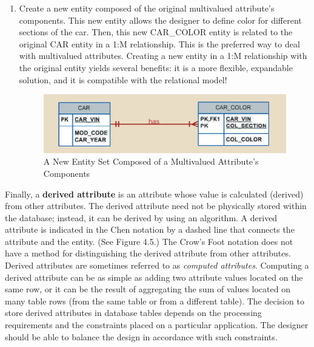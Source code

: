 \documentclass[a4paper, 12pt, titlepage]{report}
\begin{document}
{\begin{enumerate}
\begin{figure}[H]
\caption{Splitting Multivalued Attributes into New Attributes}
\end{figure}
Although this solution seems to work, its adoption can lead to major structural problems in the table. It is only acceptable if every instance will have the same number of values for the multivalued attribute, and no instance will ever have more values. However, even in this case, it is a gamble that new changes in the environment will never create a situation where an instance would have more values than before.
\item Create a new entity composed of the original multivalued attribute’s components. This new entity allows the designer to define color for different sections of the car. Then, this new CAR\_COLOR entity is related to the original CAR entity in a 1:M relationship. This is the preferred way to deal with multivalued attributes. Creating a new entity in a 1:M relationship with the original entity yields several benefits: it is a more flexible, expandable solution, and it is compatible with the relational model!
\begin{figure}[H]
\centering
\includegraphics[scale=0.5]{Attr4}
\caption{A New Entity Set Composed of a Multivalued Attribute's Components}
\end{figure}
\end{enumerate}
\noindent Finally, a \textbf{derived attribute} is an attribute whose value is calculated (derived) from other attributes. The derived attribute need not be physically stored within the database; instead, it can be derived by using an algorithm.  A derived attribute is indicated in the Chen notation by a dashed line that connects the attribute and the entity. (See Figure 4.5.) The Crow’s Foot notation does not have a method for distinguishing the derived attribute from other attributes. Derived attributes are sometimes referred to as \emph{computed attributes}. Computing a derived attribute can be as simple as adding two attribute values located on the same row, or it can be the result of aggregating the sum of values located on many table rows (from the same table or from a different table). The decision to store derived attributes in database tables depends on the processing requirements and the constraints placed on a particular application. The designer should be able to balance the design in accordance with such constraints. 
}
\end{document}
